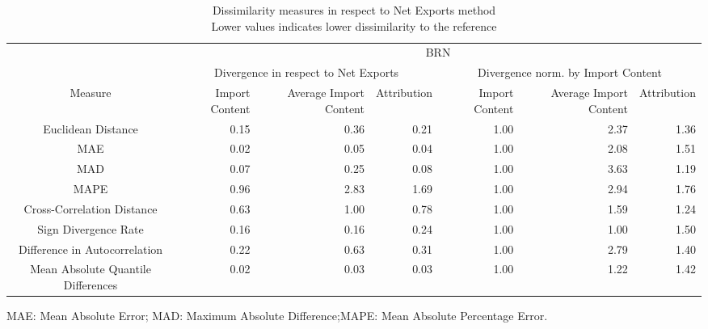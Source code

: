 \begin{table}[t]
\caption*{
{\large Dissimilarity measures in respect to Net Exports method} \\ 
{\small Lower values indicates lower dissimilarity to the reference}
} 
\fontsize{15.0pt}{18.0pt}\selectfont
\begin{tabular*}{\linewidth}{@{\extracolsep{\fill}}crrrrrr}
\toprule
 & \multicolumn{6}{c}{BRN} \\ 
\cmidrule(lr){2-7}
 & \multicolumn{3}{c}{Divergence in respect to Net Exports} & \multicolumn{3}{c}{Divergence norm. by Import Content} \\ 
\cmidrule(lr){2-4} \cmidrule(lr){5-7}
Measure & Import Content & Average Import Content & Attribution & Import Content & Average Import Content & Attribution \\ 
\midrule\addlinespace[2.5pt]
Euclidean Distance & 0.15 & 0.36 & 0.21 & 1.00 & 2.37 & 1.36 \\ 
MAE & 0.02 & 0.05 & 0.04 & 1.00 & 2.08 & 1.51 \\ 
MAD & 0.07 & 0.25 & 0.08 & 1.00 & 3.63 & 1.19 \\ 
MAPE & 0.96 & 2.83 & 1.69 & 1.00 & 2.94 & 1.76 \\ 
Cross-Correlation Distance & 0.63 & 1.00 & 0.78 & 1.00 & 1.59 & 1.24 \\ 
Sign Divergence Rate & 0.16 & 0.16 & 0.24 & 1.00 & 1.00 & 1.50 \\ 
Difference in Autocorrelation & 0.22 & 0.63 & 0.31 & 1.00 & 2.79 & 1.40 \\ 
Mean Absolute Quantile Differences & 0.02 & 0.03 & 0.03 & 1.00 & 1.22 & 1.42 \\ 
\bottomrule
\end{tabular*}
\begin{minipage}{\linewidth}
MAE: Mean Absolute Error; MAD: Maximum Absolute Difference;MAPE: Mean Absolute Percentage Error.\\
\end{minipage}
\end{table}

